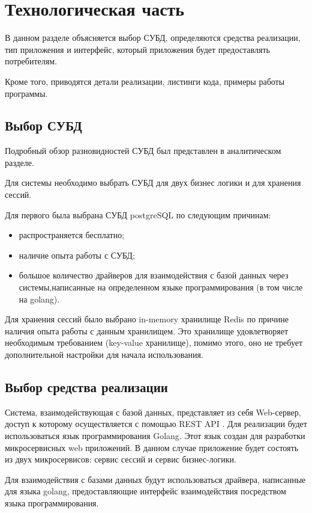 \chapter{Технологическая часть}
В данном разделе объясняется выбор СУБД, определяются средства реализации, тип приложения и интерфейс, который приложения будет предоставлять потребителям.

Кроме того, приводятся детали реализации, листинги кода, примеры работы программы.  

\section{Выбор СУБД}
Подробный обзор разновидностей СУБД был представлен в аналитическом разделе.

Для системы необходимо выбрать СУБД для двух бизнес логики и для хранения сессий.

Для первого была выбрана СУБД postgreSQL по следующим причинам:
\begin{itemize}
\item распространяется бесплатно;
\item наличие опыта работы с СУБД;
\item большое количество драйверов для взаимодействия с базой данных через системы,написанные на определенном языке программирования (в том числе на golang). 
\end{itemize}

Для хранения сессий было выбрано in-memory хранилище Redis по причине наличия опыта работы с данным хранилищем. Это хранилище удовлетворяет необходимым требованием (key-value хранилище), помимо этого, оно не требует дополнительной настройки для начала использования.  

\section{Выбор средства реализации}
Система, взаимодействующая с базой данных, представляет из себя Web-сервер, доступ к которому осуществляется с помощью REST API \cite{rest-api}.  
Для реализации будет использоваться язык программирования Golang\cite{golang}. Этот язык 
создан для разработки микросервисных web приложений. 
В данном случае приложение будет состоять из двух микросервисов: сервис сессий и сервис бизнес-логики. 

Для взаимодействия с базами данных будут использоваться драйвера, написанные для языка golang, предоставляющие интерфейс взаимодействия посредством языка программирования.  

